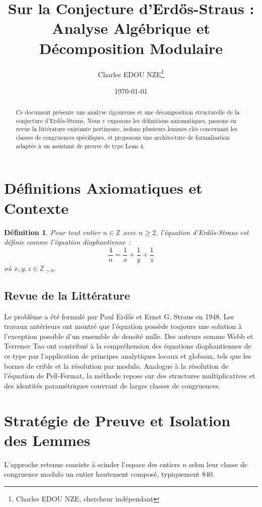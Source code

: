 \documentclass[12pt, a4paper]{article}
\title{Sur la Conjecture d'Erdős-Straus : Analyse Algébrique et Décomposition Modulaire}
\author{Charles EDOU NZE\thanks{Charles EDOU NZE, chercheur indépendant}}
\date{\today}
\newtheorem{definition}[theorem]{Définition}
\begin{document}
\maketitle

\begin{abstract}
Ce document présente une analyse rigoureuse et une décomposition structurelle de la conjecture d'Erdős-Straus. Nous y exposons les définitions axiomatiques, passons en revue la littérature existante pertinente, isolons plusieurs lemmes clés concernant les classes de congruences spécifiques, et proposons une architecture de formalisation adaptée à un assistant de preuve de type Lean 4.
\end{abstract}

\tableofcontents
\newpage

\section{Définitions Axiomatiques et Contexte}
\begin{definition}
Pour tout entier $n \in \mathbb{Z}$ avec $n \ge 2$, l'équation d'Erdős-Straus est définie comme l'équation diophantienne :
\[\frac{4}{n} = \frac{1}{x} + \frac{1}{y} + \frac{1}{z}\]
où $x, y, z \in \mathbb{Z}_{>0}$.
\end{definition}

\subsection{Revue de la Littérature}
Le problème a été formulé par Paul Erdős et Ernst G. Straus en 1948. Les travaux antérieurs ont montré que l'équation possède toujours une solution à l'exception possible d'un ensemble de densité nulle. Des auteurs comme Webb et Terrence Tao ont contribué à la compréhension des équations diophantiennes de ce type par l'application de principes analytiques locaux et globaux, tels que les bornes de crible et la résolution par modulo. Analogue à la résolution de l'équation de Pell-Fermat, la méthode repose sur des structures multiplicatives et des identités paramétriques couvrant de larges classes de congruences.

\section{Stratégie de Preuve et Isolation des Lemmes}
L'approche retenue consiste à scinder l'espace des entiers $n$ selon leur classe de congruence modulo un entier hautement composé, typiquement $840$.
\end{document}
